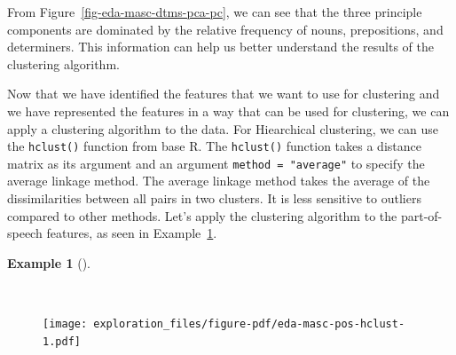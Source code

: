 \documentclass[
  letterpaper,
  DIV=11,
  numbers=noendperiod]{scrreport}
\newenvironment{Shaded}{\begin{snugshade}}{\end{snugshade}}
\newcommand{\AttributeTok}[1]{\textcolor[rgb]{0.00,0.00,0.00}{#1}}
\newcommand{\CommentTok}[1]{\textcolor[rgb]{0.00,0.00,0.00}{\textit{#1}}}
\newcommand{\DecValTok}[1]{\textcolor[rgb]{0.00,0.00,0.00}{#1}}
\newcommand{\FunctionTok}[1]{\textcolor[rgb]{0.00,0.00,0.00}{#1}}
\newcommand{\NormalTok}[1]{\textcolor[rgb]{0.00,0.00,0.00}{#1}}
\newcommand{\OtherTok}[1]{\textcolor[rgb]{0.00,0.00,0.00}{#1}}
\newcommand{\SpecialCharTok}[1]{\textcolor[rgb]{0.00,0.00,0.00}{#1}}
\newcommand{\StringTok}[1]{\textcolor[rgb]{0.00,0.00,0.00}{#1}}
\theoremstyle{definition}
\newtheorem{example}{Example}[chapter]
\theoremstyle{remark}
\begin{document}
From Figure~\ref{fig-eda-masc-dtms-pca-pc}, we can see that the three
principle components are dominated by the relative frequency of nouns,
prepositions, and determiners. This information can help us better
understand the results of the clustering algorithm.

Now that we have identified the features that we want to use for
clustering and we have represented the features in a way that can be
used for clustering, we can apply a clustering algorithm to the data.
For Hiearchical clustering, we can use the \texttt{hclust()} function
from base R. The \texttt{hclust()} function takes a distance matrix as
its argument and an argument \texttt{method\ =\ "average"} to specify
the average linkage method. The average linkage method takes the average
of the dissimilarities between all pairs in two clusters. It is less
sensitive to outliers compared to other methods. Let's apply the
clustering algorithm to the part-of-speech features, as seen in
Example~\ref{exm-eda-masc-pos-hclust}.

\begin{example}[]\protect\hypertarget{exm-eda-masc-pos-hclust}{}\label{exm-eda-masc-pos-hclust}

~

\begin{Shaded}
\end{Shaded}

\begin{figure}[H]

{\centering \texttt{[image: exploration\_files/figure-pdf/eda-masc-pos-hclust-1.pdf]}

}

\end{figure}

\end{example}
\end{document}
